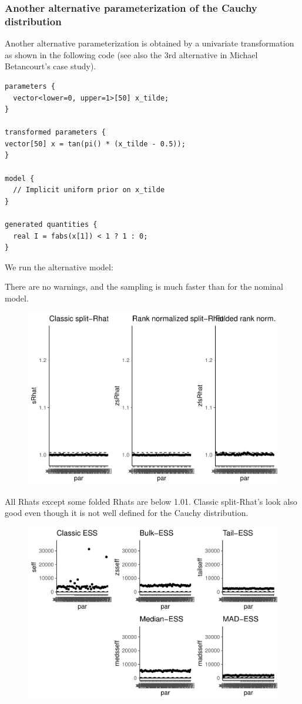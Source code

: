 \documentclass[american,]{article}
\begin{document}
\hypertarget{another-alternative-parameterization-of-the-cauchy-distribution}{%
\subsubsection*{Another alternative parameterization of the Cauchy
distribution}\label{another-alternative-parameterization-of-the-cauchy-distribution}}

Another alternative parameterization is obtained by a univariate
transformation as shown in the following code (see also the 3rd
alternative in Michael Betancourt's case study).

\begin{verbatim}
parameters {
  vector<lower=0, upper=1>[50] x_tilde;
}

transformed parameters {
vector[50] x = tan(pi() * (x_tilde - 0.5));
}

model {
  // Implicit uniform prior on x_tilde
}

generated quantities {
  real I = fabs(x[1]) < 1 ? 1 : 0;
}
\end{verbatim}

We run the alternative model:

There are no warnings, and the sampling is much faster than for the
nominal model.

\begin{figure}[t]
  \centering
  \includegraphics[width=0.6\linewidth]{graphics/rhat-fit-alt3-1.pdf}
\end{figure}

All Rhats except some folded Rhats are below 1.01. Classic split-Rhat's
look also good even though it is not well defined for the Cauchy
distribution.

\begin{figure}[t]
  \centering
  \includegraphics[width=0.6\linewidth]{graphics/ess-fit-alt3-1.pdf}
\end{figure}
\end{document}
